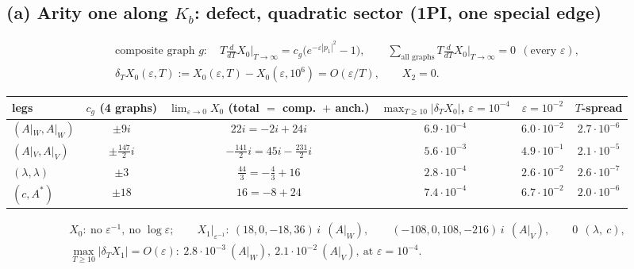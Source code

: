 \documentclass[10pt]{article}
\begin{document}
\subsection*{(a) Arity one along $K_b$: defect, quadratic sector (1PI, one special edge)}
\begin{gather*}
\text{composite graph }g:\quad T\frac{d}{dT}X_0\Big|_{T\to\infty}=c_g\big(e^{-\varepsilon|p_1|^2}-1\big),\qquad
\sum_{\text{all graphs}}T\frac{d}{dT}X_0\Big|_{T\to\infty}=0\ \ (\text{every }\varepsilon),\\
\delta_TX_0(\varepsilon,T):=X_0(\varepsilon,T)-X_0(\varepsilon,10^6)=O(\varepsilon/T),\qquad X_2=0 .
\end{gather*}
{\footnotesize
\begin{tabular}{lccccc}
\toprule
legs & $c_g$ (4 graphs) & $\lim_{\varepsilon\to0}X_0$ (total $=$ comp.\ $+$ anch.) & $\max_{T\ge10}|\delta_TX_0|$, $\varepsilon=10^{-4}$ & $\varepsilon=10^{-2}$ & $T$-spread\\
\midrule
$(A|_W,A|_W)$ & $\pm9i$ & $22i=-2i+24i$ & $6.9\cdot10^{-4}$ & $6.0\cdot10^{-2}$ & $2.7\cdot10^{-6}$\\
$(A|_V,A|_V)$ & $\pm\tfrac{147}2i$ & $-\tfrac{141}2i=45i-\tfrac{231}2i$ & $5.6\cdot10^{-3}$ & $4.9\cdot10^{-1}$ & $2.1\cdot10^{-5}$\\
$(\lambda,\lambda)$ & $\pm3$ & $\tfrac{44}3=-\tfrac43+16$ & $2.8\cdot10^{-4}$ & $2.6\cdot10^{-2}$ & $2.6\cdot10^{-7}$\\
$(c,A^*)$ & $\pm18$ & $16=-8+24$ & $7.4\cdot10^{-4}$ & $6.7\cdot10^{-2}$ & $2.0\cdot10^{-6}$\\
\bottomrule
\end{tabular}}
\begin{gather*}
X_0:\ \text{no }\varepsilon^{-1},\ \text{no }\log\varepsilon;\qquad
X_1\big|_{\varepsilon^{-1}}:\ (18,0,-18,36)\,i\ \ (A|_W),\qquad (-108,0,108,-216)\,i\ \ (A|_V),\qquad 0\ \ (\lambda,\ c),\\
\max_{T\ge10}|\delta_TX_1|=O(\varepsilon):\ 2.8\cdot10^{-3}\ (A|_W),\ 2.1\cdot10^{-2}\ (A|_V),\ \text{at }\varepsilon=10^{-4}.
\end{gather*}
\end{document}
